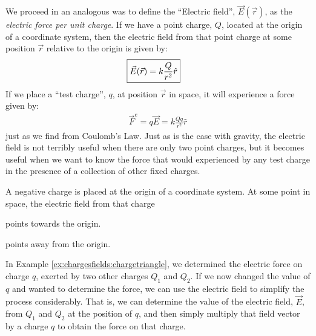 We proceed in an analogous was to define the ``Electric field'', $\vec E(\vec r)$, as the \textit{electric force per unit charge}. If we have a point charge, $Q$, located at the origin of a coordinate system, then the electric field from that point charge at some position $\vec r$ relative to the origin is given by:
\begin{align*}
\Aboxed{\vec E(\vec r) = k\frac{Q}{r^2}\hat r}
\end{align*}
If we place a ``test charge'', $q$, at position $\vec r$ in space, it will experience a force given by:
\begin{align*}
\vec F^e=q\vec E=k\frac{Qq}{r^2}\hat r
\end{align*}
just as we find from Coulomb's Law. Just as is the case with gravity, the electric field is not terribly useful when there are only two point charges, but it becomes useful when we want to know the force that would experienced by any test charge in the presence of a collection of other fixed charges. 
\begin{checkpoint}\label{cp:chargesfields:edirection}
\begin{MCquestion}{A negative charge is placed at the origin of a coordinate system. At some point in space, the electric field from that charge}
\item points towards the origin. \correct
\item points away from the origin.
\end{MCquestion}
\end{checkpoint}
In Example \ref{ex:chargesfields:chargetriangle}, we determined the electric force on charge $q$, exerted by two other charges $Q_1$ and $Q_2$. If we now changed the value of $q$ and wanted to determine the force, we can use the electric field to simplify the process considerably. That is, we can determine the value of the electric field, $\vec E$, from $Q_1$ and $Q_2$ at the position of $q$, and then simply multiply that field vector by a charge $q$ to obtain the force on that charge.
